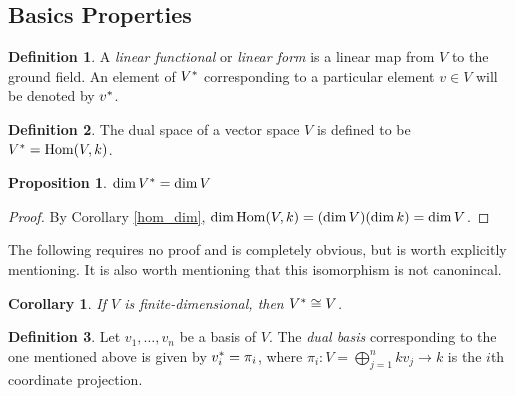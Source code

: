 \documentclass[12pt]{article}
\theoremstyle{definition}
\newtheorem{definition}{Definition}[section]
\theoremstyle{plain}
\newtheorem{proposition}[theorem] {Proposition}
\newtheorem{corollary}[theorem]{Corollary}
\numberwithin{equation}{section}
\theoremstyle{definition}
\begin{document}
\subsection{Basics Properties}

\begin{definition}
A \textit{linear functional} or \textit{linear form} is a linear map from $ V $ to the ground field. An element of $ V^{*} $ corresponding to a particular element $ v \in V $ will be denoted by $ v^{*} $.
\end{definition}

\begin{definition}
The dual space of a vector space $ V $ is defined to be $ V^{*} = \operatorname{Hom}(V, k) $.
\end{definition}

\begin{proposition}
$ \dim V^{*} = \dim V$
\end{proposition}

\begin{proof}
By Corollary \ref{hom_dim}, $ \dim \operatorname{Hom}(V, k) = (\dim V) (\dim k) = \dim V$.
\end{proof}

The following requires no proof and is completely obvious, but is worth explicitly mentioning. It is also worth mentioning that this isomorphism is not canonincal.

\begin{corollary}
If $ V $ is finite-dimensional, then $ V^{*} \cong V $.
\end{corollary}

\begin{definition}
Let $ v_1, \ldots, v_n $ be a basis of $ V $. The \textit{dual basis} corresponding to the one mentioned above is given by $ v_i^{*} = \pi_i $, where $ \pi_i : V = \bigoplus_{j = 1}^n k v_j \to k $ is the $ i $th coordinate projection.
\end{definition}
\end{document}

